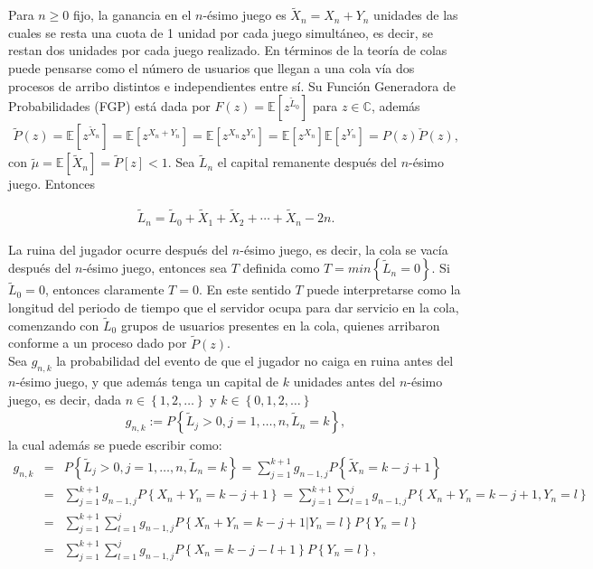 \documentclass{article}
\newcommand{\esp}{\mathbb{E}}
\numberwithin{equation}{section}
\begin{document}
Para $n\geq0$ fijo, la ganancia en el $n$-\'esimo juego es $\tilde{X}_{n}=X_{n}+Y_{n}$ unidades de las cuales se resta una cuota de 1 unidad por cada juego simult\'aneo, es decir, se restan dos unidades por cada juego realizado. En t\'erminos de la teor\'ia de colas puede pensarse como el n\'umero de usuarios que llegan a una cola v\'ia dos procesos de arribo distintos e independientes entre s\'i. Su Funci\'on Generadora de Probabilidades (FGP) est\'a dada por $F\left(z\right)=\esp\left[z^{\tilde{L}_{0}}\right]$ para $z\in\mathbb{C}$, adem\'as
\begin{eqnarray}
\tilde{P}\left(z\right)=\esp\left[z^{\tilde{X}_{n}}\right]=\esp\left[z^{X_{n}+Y_{n}}\right]=\esp\left[z^{X_{n}}z^{Y_{n}}\right]=\esp\left[z^{X_{n}}\right]\esp\left[z^{Y_{n}}\right]=P\left(z\right)\check{P}\left(z\right),
\end{eqnarray}
con $\tilde{\mu}=\esp\left[\tilde{X}_{n}\right]=\tilde{P}\left[z\right]<1$. Sea $\tilde{L}_{n}$ el capital remanente despu\'es del $n$-\'esimo
juego. Entonces

\begin{eqnarray}
\tilde{L}_{n}=\tilde{L}_{0}+\tilde{X}_{1}+\tilde{X}_{2}+\cdots+\tilde{X}_{n}-2n.
\end{eqnarray}


La ruina del jugador ocurre despu\'es del $n$-\'esimo juego, es decir, la cola se vac\'ia despu\'es del $n$-\'esimo juego, entonces sea $T$ definida como $T=min\left\{\tilde{L}_{n}=0\right\}$. Si $\tilde{L}_{0}=0$, entonces claramente $T=0$. En este sentido $T$ puede interpretarse como la longitud del periodo de tiempo que el servidor ocupa para dar servicio en la cola, comenzando con $\tilde{L}_{0}$ grupos de usuarios presentes en la cola, quienes arribaron conforme a un proceso dado por $\tilde{P}\left(z\right)$.\\

Sea $g_{n,k}$ la probabilidad del evento de que el jugador no caiga en ruina antes del $n$-\'esimo juego, y que adem\'as tenga un capital de $k$ unidades antes del $n$-\'esimo juego, es decir, dada $n\in\left\{1,2,\ldots\right\}$ y $k\in\left\{0,1,2,\ldots\right\}$
\begin{eqnarray}
g_{n,k}:=P\left\{\tilde{L}_{j}>0, j=1,\ldots,n,
\tilde{L}_{n}=k\right\},
\end{eqnarray}
la cual adem\'as se puede escribir como:
\begin{eqnarray*}
g_{n,k}&=&P\left\{\tilde{L}_{j}>0, j=1,\ldots,n,
\tilde{L}_{n}=k\right\}=\sum_{j=1}^{k+1}g_{n-1,j}P\left\{\tilde{X}_{n}=k-j+1\right\}\\
&=&\sum_{j=1}^{k+1}g_{n-1,j}P\left\{X_{n}+Y_{n}=k-j+1\right\}=\sum_{j=1}^{k+1}\sum_{l=1}^{j}g_{n-1,j}P\left\{X_{n}+Y_{n}=k-j+1,Y_{n}=l\right\}\\
&=&\sum_{j=1}^{k+1}\sum_{l=1}^{j}g_{n-1,j}P\left\{X_{n}+Y_{n}=k-j+1|Y_{n}=l\right\}P\left\{Y_{n}=l\right\}\\
&=&\sum_{j=1}^{k+1}\sum_{l=1}^{j}g_{n-1,j}P\left\{X_{n}=k-j-l+1\right\}P\left\{Y_{n}=l\right\},
\end{eqnarray*}
\end{document}
